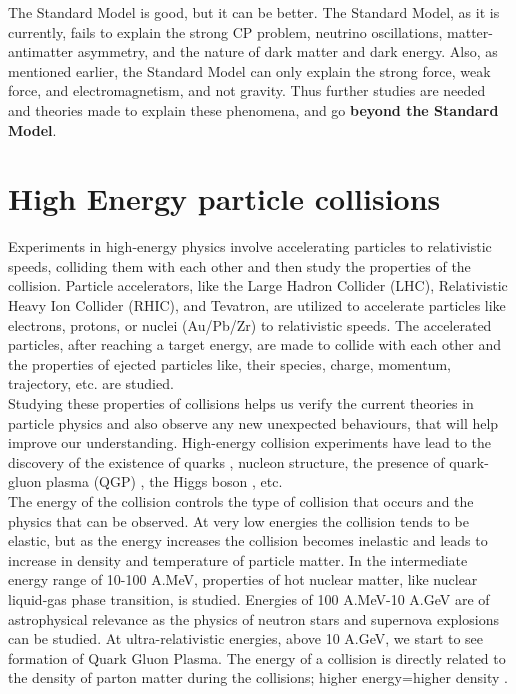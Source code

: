 \documentclass[12pt,a4paper,twoside]{report}
\begin{document}
The Standard Model is good, but it can be better. The Standard Model, as it  is currently, fails to explain the strong CP problem\cite{Ref:CPviolation}, neutrino oscillations\cite{Ref:neutrino-oscill}, matter-antimatter asymmetry\cite{Ref:matter-antimatter-prob}, and the nature of dark matter and dark energy\cite{Ref:dark-matter-y-energy}. Also, as mentioned earlier, the Standard Model can only explain the strong force, weak force, and electromagnetism, and not gravity. Thus further studies are needed and theories made to explain these phenomena, and go \textbf{beyond the Standard Model}.\\
\section{High Energy particle collisions}
Experiments in high-energy physics involve accelerating particles to relativistic speeds, colliding them with each other and then study the properties of the collision. Particle accelerators, like the Large Hadron Collider (LHC), Relativistic Heavy Ion Collider (RHIC), and Tevatron, are utilized to accelerate particles like electrons, protons, or nuclei (Au/Pb/Zr) to relativistic speeds. The accelerated particles, after reaching a target energy, are made to collide with each other and the properties of ejected particles like, their species, charge, momentum, trajectory, etc. are studied.\\
Studying these properties of collisions helps us verify the current theories in particle physics and also observe any new unexpected behaviours, that will help improve our understanding. High-energy collision experiments have lead to the discovery of the existence of quarks \cite{Ref:quarkpaper1}\cite{Ref:quarkpaper2}, nucleon structure, the presence of quark-gluon plasma (QGP) \cite{Ref:QGP-discovery}, the Higgs boson \cite{Ref:higgs-ATLAS}\cite{Ref:higgs-CMS}, etc.\\
The energy of the collision controls the type of collision that occurs and the physics that can be observed. At very low energies the collision tends to be elastic, but as the energy increases the collision becomes inelastic and leads to increase in density and temperature of particle matter. In the intermediate energy range of 10-100 A.MeV, properties of hot nuclear matter, like nuclear liquid-gas phase transition, is studied. Energies of 100 A.MeV-10 A.GeV are of astrophysical relevance as the physics of neutron stars and supernova explosions can be studied. At ultra-relativistic energies, above 10 A.GeV, we start to see formation of Quark Gluon Plasma. The energy of a collision is directly related to the density of parton matter during the collisions; higher energy=higher density \cite{Ref:Csernai}.\\
\end{document}

